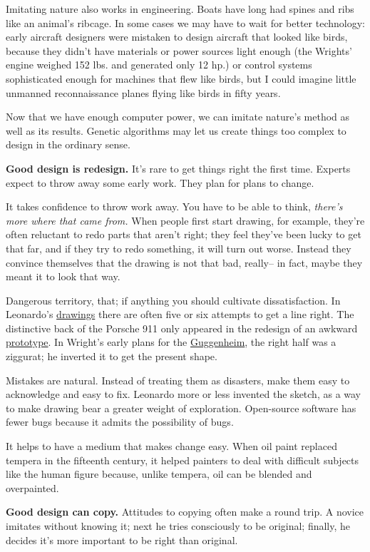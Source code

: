 \documentclass[12pt]{book}
\begin{document}
Imitating nature also works in engineering. Boats have long had spines
and ribs like an animal's ribcage. In some cases we may have to wait for
better technology: early aircraft designers were mistaken to design
aircraft that looked like birds, because they didn't have materials or
power sources light enough (the Wrights' engine weighed 152 lbs. and
generated only 12 hp.) or control systems sophisticated enough for
machines that flew like birds, but I could imagine little unmanned
reconnaissance planes flying like birds in fifty years.

Now that we have enough computer power, we can imitate nature's method
as well as its results. Genetic algorithms may let us create things too
complex to design in the ordinary sense.

\textbf{Good design is redesign.} It's rare to get things right the
first time. Experts expect to throw away some early work. They plan for
plans to change.

It takes confidence to throw work away. You have to be able to think,
\emph{there's more where that came from.} When people first start
drawing, for example, they're often reluctant to redo parts that aren't
right; they feel they've been lucky to get that far, and if they try to
redo something, it will turn out worse. Instead they convince themselves
that the drawing is not that bad, really-- in fact, maybe they meant it
to look that way.

Dangerous territory, that; if anything you should cultivate
dissatisfaction. In Leonardo's \href{leonardo.html}{drawings} there are
often five or six attempts to get a line right. The distinctive back of
the Porsche 911 only appeared in the redesign of an awkward
\href{porsche695.html}{prototype}. In Wright's early plans for the
\href{guggen.html}{Guggenheim}, the right half was a ziggurat; he
inverted it to get the present shape.

Mistakes are natural. Instead of treating them as disasters, make them
easy to acknowledge and easy to fix. Leonardo more or less invented the
sketch, as a way to make drawing bear a greater weight of exploration.
Open-source software has fewer bugs because it admits the possibility of
bugs.

It helps to have a medium that makes change easy. When oil paint
replaced tempera in the fifteenth century, it helped painters to deal
with difficult subjects like the human figure because, unlike tempera,
oil can be blended and overpainted.

\textbf{Good design can copy.} Attitudes to copying often make a round
trip. A novice imitates without knowing it; next he tries consciously to
be original; finally, he decides it's more important to be right than
original.
\end{document}
